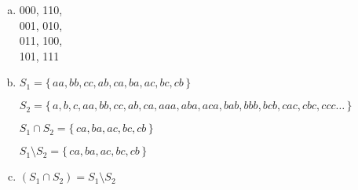 \documentclass[12pt]{article}
\begin{document}
\begin{enumerate}[a)]
    \item
        000, 110,\\
        001, 010,\\
        011, 100,\\
        101, 111

    \bigskip

    \item
        $S_1 = \{\,aa,bb,cc,ab,ca,ba,ac,bc,cb\,\}$

        $S_2 = \{\,a,b,c,aa,bb,cc,ab,ca,aaa,aba,aca,bab,bbb,bcb,cac,cbc,ccc\dots\,\}$

        \bigskip

        $S_1 \cap S_2 = \{\,ca,ba,ac,bc,cb\,\}$

        $S_1 \setminus S_2 = \{\,ca,ba,ac,bc,cb\,\}$

    \bigskip

    \item
        $(S_1 \cap S_2) = S_1 \setminus S_2$
\end{enumerate}
\end{document}
